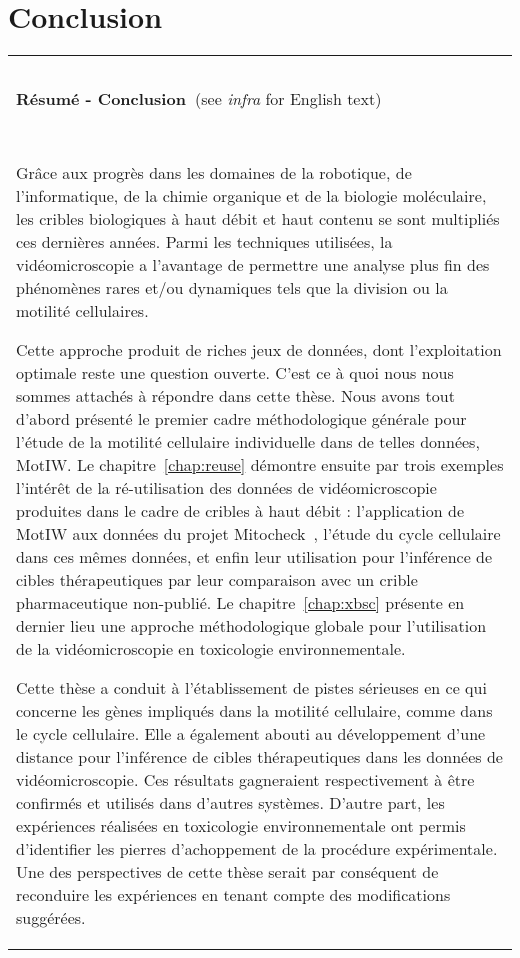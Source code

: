 \chapter{Conclusion}
\begin{table}[!ht]
\begin{tabular}{|l|}
\hline
~\\

\textbf{Résumé - Conclusion~}(see \textit{infra} for English text)\\
~\\
\parbox{15cm}{Grâce aux progrès dans les domaines de la robotique, de l'informatique, de la chimie organique et de la biologie moléculaire, les cribles biologiques à haut débit et haut contenu se sont multipliés ces dernières années. Parmi les techniques utilisées, la vidéomicroscopie a l'avantage de permettre une analyse plus fin des phénomènes rares et/ou dynamiques tels que la division ou la motilité cellulaires.

Cette approche produit de riches jeux de données, dont l'exploitation optimale reste une question ouverte. C'est ce à quoi nous nous sommes attachés à répondre dans cette thèse. Nous avons tout d'abord présenté le premier cadre méthodologique générale pour l'étude de la motilité cellulaire individuelle dans de telles données, MotIW. Le chapitre~\ref{chap:reuse} démontre ensuite par trois exemples l'intérêt de la ré-utilisation des données de vidéomicroscopie produites dans le cadre de cribles à haut débit : l'application de MotIW aux données du projet Mitocheck~\cite{pmid20360735}, l'étude du cycle cellulaire dans ces mêmes données, et enfin leur utilisation pour l'inférence de cibles thérapeutiques par leur comparaison avec un crible pharmaceutique non-publié. Le chapitre~\ref{chap:xbsc} présente en dernier lieu une approche méthodologique globale pour l'utilisation de la vidéomicroscopie en toxicologie environnementale.

Cette thèse a conduit à l'établissement de pistes sérieuses en ce qui concerne les gènes impliqués dans la motilité cellulaire, comme dans le cycle cellulaire. Elle a également abouti au développement d'une distance pour l'inférence de cibles thérapeutiques dans les données de vidéomicroscopie. Ces résultats gagneraient respectivement à être confirmés et utilisés dans d'autres systèmes. D'autre part, les expériences réalisées en toxicologie environnementale ont permis d'identifier les pierres d'achoppement de la procédure expérimentale. Une des perspectives de cette thèse serait par conséquent de reconduire les expériences en tenant compte des modifications suggérées.}\\
~\\
\hline
\end{tabular}
\end{table}
